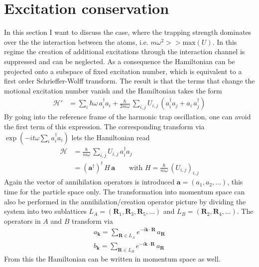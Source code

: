 \section{Excitation conservation}
In this section I want to discuss the case, where the trapping strength dominates over the the interaction between the atoms, i.e. $m\omega^2>>\text{max}(U)$. In this regime the creation of additional excitations through the interaction channel is suppressed and can be neglected. As a consequence the Hamiltonian can be projected onto a subspace of fixed excitation number, which is equivalent to a first order Schrieffer-Wolff transform. The result is that the terms that change the motional excitation number vanish and the Hamiltonian takes the form
\begin{align*}
    \mathcal{H}' &= \sum_i \hbar\omega\,a_i^\dagger a_i +\frac{\hbar}{2m\omega}\, \sum_{i,j} U_{i,j}\,\left( a_i^\dagger a_j + a_i\,a_j^\dagger  \right)
\end{align*}
By going into the reference frame of the harmonic trap oscillation, one can avoid the first term of this expression. The corresponding transform via $\exp(-it\omega\sum_ia_i^\dagger a_i)$ lets the Hamiltonian read
\begin{align*}
    \mathcal{H}&=\frac{\hbar}{m\omega}\, \sum_{i,j} U_{i,j}\,a_i^\dagger a_j\\
    &= (\mathbf{a}^\dagger)^t\,H\,\mathbf{a}\qquad\text{with }H=\frac{\hbar}{m\omega}\,\left(  U_{i,j} \right)_{i,j}
\end{align*}
Again the vector of annihilation operators is introduced $\mathbf{a}=(a_1,a_2,\dots)$, this time for the particle space only. The transformation into momentum space can also be performed in the annihilation/creation operator picture by dividing the system into two sublattices $L_A=(\mathbf{R}_1,\mathbf{R}_3,\mathbf{R}_5,\dots)$ and $L_B=(\mathbf{R}_2,\mathbf{R}_4,\dots)$. The operators in $A$ and $B$ transform via
\begin{align*}
    a_{\mathbf{k}} = \sum_{\mathbf{R}\in L_{A}} e^{-i\mathbf{k}\cdot\mathbf{R}}\,a_{\mathbf{R}}\\
    b_{\mathbf{k}} = \sum_{\mathbf{R}\in L_{B}} e^{-i\mathbf{k}\cdot\mathbf{R}}\,a_{\mathbf{R}}
\end{align*}
From this the Hamiltonian can be written in momentum space as well.

